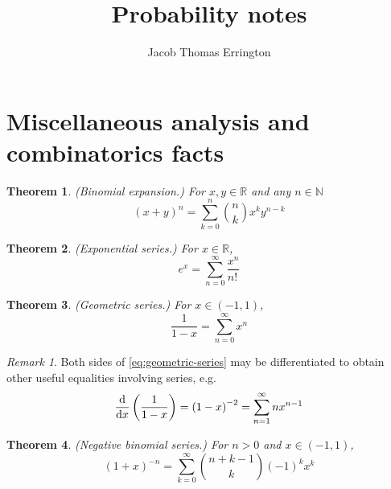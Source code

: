 \documentclass[11pt]{article}
\author{Jacob Thomas Errington}
\title{Probability notes}
\date{}
\newtheorem{thm}{Theorem}
\theoremstyle{definition}
\theoremstyle{remark}
\newtheorem{rem}{Remark}[section]
\newcommand{\parens}[1]{\left(#1\right)}
\newcommand{\fact}{!\,}
\newcommand{\infsum}{\sum^\infty}
\renewcommand{\d}{\mathrm{d}}
\newcommand{\deriv}[2][]{%
    \ensuremath
    \frac{\d #1}{\d #2}
}
\newcommand{\R}{\mathbb{R}}
\newcommand{\N}{\mathbb{N}}
\begin{document}
\maketitle

\section{Miscellaneous analysis and combinatorics facts}

\begin{thm}{(Binomial expansion.)}
    \label{thm:binomial-expansion}
    For $x, y \in \R$ and any $n \in \N$
    \begin{equation}
        \label{eq:binomial-expansion}
        (x + y)^n = \sum_{k=0}^n {
            {n \choose k} x^k y^{n -k}
        }
    \end{equation}
\end{thm}

\begin{thm}{(Exponential series.)}
    \label{thm:exponential-series}
    For $x \in \R$,
    \begin{equation}
        \label{eq:series-ex}
        e^x = \infsum_{n=0} {
            \frac{x^n}{n\fact}
        }
    \end{equation}
\end{thm}

\begin{thm}{(Geometric series.)}
    \label{thm:geometric-series}
    For $x \in (-1, 1)$,
    \begin{equation}
        \label{eq:geometric-series}
        \frac{1}{1 - x} = \infsum_{n=0} { x^n }
    \end{equation}
\end{thm}

\begin{rem}
    \label{rem:differentiate-geometric-series}
    Both sides of \eqref{eq:geometric-series} may be differentiated to obtain
    other useful equalities involving series, e.g.
    \begin{equation*}
        \deriv{x}\parens{ \frac{1}{1-x} }
        =
        \parens{1-x}^{-2}
        =
        \infsum_{n=1} { n x^{n-1} }
    \end{equation*}
\end{rem}

\begin{thm}{(Negative binomial series.)}
    \label{thm:negative-binomial-series}
    For $n > 0$ and $x \in (-1, 1)$,
    \begin{equation}
        \label{eq:negative-binomial-series}
        (1+x)^{-n} = \infsum_{k=0} {
            {{n + k - 1} \choose k} (-1)^k x^k
        }
    \end{equation}
\end{thm}
\end{document}

